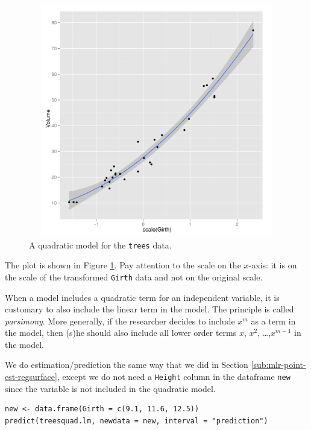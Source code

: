 \documentclass[captions=tableheading]{scrbook}
\begin{document}
\begin{example}
\begin{figure}[ht!]
    \includegraphics[width=5in, height=4in]{img/Fitting-the-Quadratic.pdf}
    \caption[Quadratic model for the \texttt{trees} data]{\small A quadratic model for the \texttt{trees} data.}
    \label{fig:Fitting-the-Quadratic}
  \end{figure}

The plot is shown in Figure \ref{fig:Fitting-the-Quadratic}. Pay attention to the scale on the $x$-axis: it is on the scale of the transformed \texttt{Girth} data and not on the original scale.

\end{example}


\begin{rem}
When a model includes a quadratic term for an independent variable, it is customary to also include the linear term in the model. The principle is called \emph{parsimony}. More generally, if the researcher decides to include $x^{m}$ as a term in the model, then (s)he should also include all lower order terms $x$, $x^{2}$, \ldots{},$x^{m-1}$ in the model.
\end{rem}

We do estimation/prediction the same way that we did in Section \ref{sub:mlr-point-est-regsurface}, except we do not need a \texttt{Height} column in the dataframe \texttt{new} since the variable is not included in the quadratic model.


\begin{verbatim}
new <- data.frame(Girth = c(9.1, 11.6, 12.5))
predict(treesquad.lm, newdata = new, interval = "prediction")
\end{verbatim}
\end{document}
